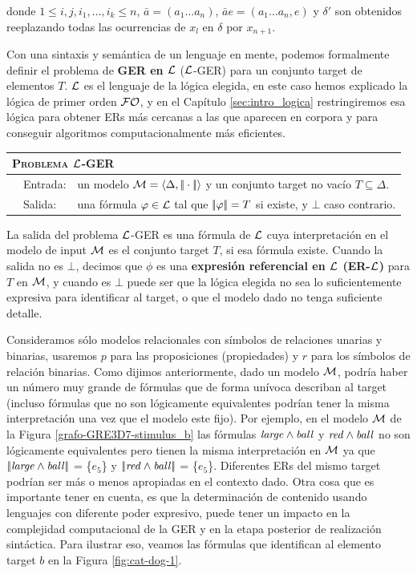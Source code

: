 donde $1 \le i,j, i_1, \ldots, i_k \le n$, $\bar{a} = (a_1\ldots
a_n)$, $\bar{a}e = (a_1\ldots a_n,e)$ y $\delta'$ son
obtenidos reeplazando todas las ocurrencias de $x_l$ en $\delta$ por
$x_{n+1}$. 

Con una sintaxis y sem\'antica de un lenguaje en mente, podemos formalmente definir el problema de \textbf{GER en $\mathcal{L}$} ($\mathcal{L}$-GER) para un conjunto target de elementos $T$. $\mathcal{L}$ es el lenguaje de la l\'ogica elegida, en este caso hemos explicado la l\'ogica de primer orden $\mathcal{FO}$, y en el Cap\'itulo \ref{sec:intro_logica} restringiremos esa l\'ogica para obtener ERs m\'as cercanas a las que aparecen en corpora y para conseguir algoritmos computacionalmente m\'as eficientes.

\medskip
\noindent
{\small
\begin{center}
\begin{tabular}{ll} \hline
\multicolumn{2}{l}{
\textsc{Problema $\mathcal{L}$-GER }}\\ \hline
\ \ Entrada: & un modelo $\mathcal{M}=\langle \Delta,|\!|\cdot|\!| \rangle$ y un conjunto target no vac\'io $T \subseteq \Delta$.\\
\ \ Salida: & una f\'ormula $\varphi \in \mathcal{L}$ tal que
$|\!|\varphi|\!| = T$ si existe, y $\bot$ caso contrario.\\ \hline
\end{tabular}
\end{center}}

La salida del problema $\mathcal{L}$-GER es una f\'ormula de
$\mathcal{L}$ cuya interpretaci\'on en el modelo de input $\mathcal{M}$ es el conjunto target $T$, si
esa f\'ormula existe. 
Cuando la salida no es $\bot$, decimos que $\phi$ es una
\textbf{expresi\'on referencial en $\mathcal{L}$ (ER-$\mathcal{L}$)} para $T$ en $\mathcal{M}$, y cuando es $\bot$ puede ser que la l\'ogica elegida no sea lo suficientemente expresiva para identificar al target, o que el modelo dado no tenga suficiente detalle.

Consideramos s\'olo modelos relacionales con s\'imbolos de relaciones unarias y binarias, usaremos $p$ para las proposiciones (propiedades) y $r$ para los s\'imbolos de relaci\'on binarias.
Como dijimos anteriormente, dado un modelo $\mathcal{M}$, podr\'ia haber un n\'umero muy grande de f\'ormulas que de forma un\'ivoca
describan al target (incluso f\'ormulas que no son l\'ogicamente equivalentes podr\'ian tener
la misma interpretaci\'on una vez que el modelo este fijo). Por ejemplo, en el modelo $\mathcal{M}$ de la Figura \ref{grafo-GRE3D7-stimulus_b} las f\'ormulas $\mathit{large} \land \mathit{ball}$ y $\mathit{red} \land \mathit{ball}$ no son l\'ogicamente equivalentes pero tienen la misma interpretaci\'on en $\mathcal{M}$ ya que $|\!|\mathit{large} \land \mathit{ball}|\!|$ = \{$e_5$\} y $|\!|\mathit{red} \land \mathit{ball}|\!|$ = \{$e_5$\}.
Diferentes ERs
del mismo target podr\'ian ser m\'as o menos apropiadas en el contexto dado. Otra cosa que es importante tener en cuenta, es que la determinaci\'on de contenido usando lenguajes con diferente poder expresivo, puede tener un impacto en la complejidad computacional de la GER y en la etapa posterior de realizaci\'on sint\'actica. Para ilustrar eso, veamos las f\'ormulas que identifican al elemento target $b$ en la Figura \ref{fig:cat-dog-1}.

